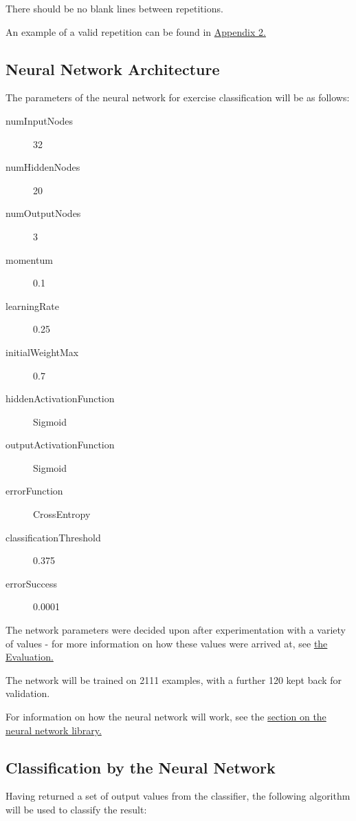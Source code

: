 \documentclass[a4paper]{article}
\begin{document}
There should be no blank lines between repetitions.

An example of a valid repetition can be found in \hyperref[subsubsec:a2_lf_normalised]{Appendix 2.}

\subsection{Neural Network Architecture}%
\label{subsec:dc_networkarchitecture}

The parameters of the neural network for exercise classification will be as follows:

\begin{description}
\item[numInputNodes] 32
\item[numHiddenNodes] 20
\item[numOutputNodes] 3
\item[momentum] 0.1
\item[learningRate] 0.25
\item[initialWeightMax] 0.7
\item[hiddenActivationFunction] Sigmoid
\item[outputActivationFunction] Sigmoid
\item[errorFunction] CrossEntropy
\item[classificationThreshold] 0.375
\item[errorSuccess] 0.0001
\end{description}


The network parameters were decided upon after experimentation with a variety of values - for more information on how these values were arrived at, see \hyperref[subsubsec:ev_cp_parameterchoiceprocess]{the Evaluation.}

The network will be trained on 2111 examples, with a further 120 kept back for validation.

For information on how the neural network will work, see the \hyperref[sec:dn]{section on the neural network library.}

\subsection{Classification by the Neural Network}%
\label{subsec:dc_classification}

Having returned a set of output values from the classifier, the following algorithm will be used to classify the result:
\end{document}
